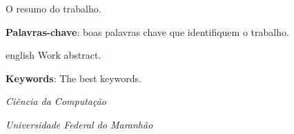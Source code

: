\documentclass[
12pt,				%
openright,			%
oneside,			%
a4paper,			%
english,			%
french,				%
spanish,			%
brazil				%
]{abntex2}
\begin{document}

\begin{resumo}
O resumo do trabalho.
	
\textbf{Palavras-chave}: boas palavras chave que identifiquem o trabalho.

\end{resumo}

%	
\begin{resumo}[Abstract]
	\begin{otherlanguage*}{english}
	Work abstract.

	\textbf{Keywords}: The best keywords.
		
	\end{otherlanguage*}
\end{resumo}


\cleardoublepage

\listoffigures*
\cleardoublepage


\listoftables*
\cleardoublepage


\begin{siglas}
\item[CC] \textit{Ciência da Computação}
\item[UFMA] \textit{Universidade Federal do Maranhão}
\end{siglas}




\tableofcontents*
\cleardoublepage
	

\textual


\end{document}
